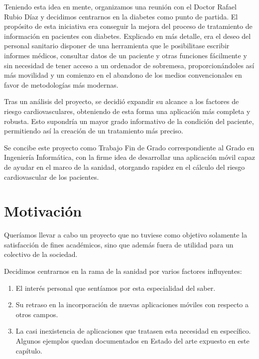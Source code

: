 \documentclass[11pt,spanish,
		listoftables,listoffigures]
		{tfgplantilla}
\begin{document}
Teniendo esta idea en mente, organizamos una reunión con el Doctor Rafael Rubio Díaz y decidimos centrarnos en la diabetes como punto de partida. El propósito de esta iniciativa era conseguir la mejora del proceso de tratamiento de información en pacientes con diabetes. Explicado en más detalle, era el deseo del personal sanitario disponer de una herramienta que le posibilitase escribir informes médicos, consultar datos de un paciente y otras funciones fácilmente y sin necesidad de tener acceso a un ordenador de sobremesa, proporcionándoles así más movilidad y un comienzo en el abandono de los medios convencionales en favor de metodologías más modernas.

Tras un análisis del proyecto, se decidió expandir su alcance a los factores de riesgo cardiovasculares, obteniendo de esta forma una aplicación más completa y robusta. Esto supondría un mayor grado informativo de la condición del paciente, permitiendo así la creación de un tratamiento más preciso.

Se concibe este proyecto como Trabajo Fin de Grado correspondiente al Grado en Ingeniería Informática, con la firme idea de desarrollar una aplicación móvil capaz de ayudar en el marco de la sanidad, otorgando rapidez en el cálculo del riesgo cardiovascular de los pacientes.

\section{Motivaci\'on}

Queríamos llevar a cabo un proyecto que no tuviese como objetivo solamente la satisfacción de fines académicos, sino que además fuera de utilidad para un colectivo de la sociedad. 

Decidimos centrarnos en la rama de la sanidad por varios factores influyentes:

\begin{enumerate}
	\item El interés personal que sentíamos por esta especialidad del saber.

	\item Su retraso en la incorporación de nuevas aplicaciones móviles con respecto a otros campos.

	\item La casi inexistencia de aplicaciones que tratasen esta necesidad en específico. Algunos ejemplos quedan documentados en \textquotedbl Estado del arte \textquotedbl{} expuesto en este capítulo.
\end{enumerate}
\end{document}
